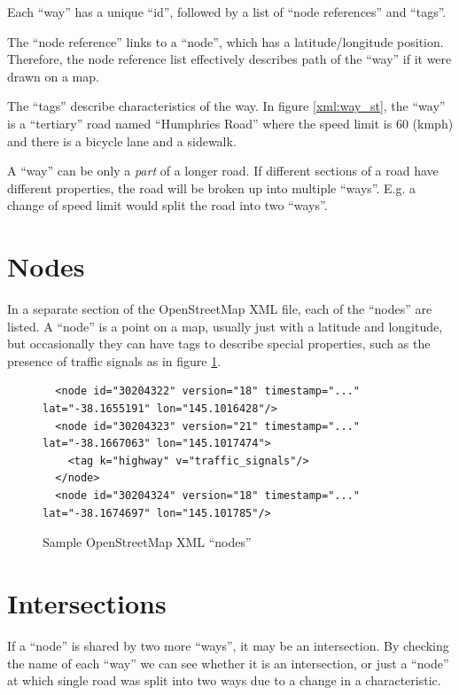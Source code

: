 \documentclass[11pt,twoside]{report}
\begin{document}
Each ``way'' has a unique ``id'', followed by a list of ``node references'' and ``tags''.

The ``node reference'' links to a ``node'', which has a latitude/longitude position.  Therefore, the node reference list effectively describes path of the ``way'' if it were drawn on a map.

The ``tags'' describe characteristics of the way.  In figure \ref{xml:way_st}, the ``way'' is a ``tertiary'' road named ``Humphries Road'' where the speed limit is 60 (kmph) and there is a bicycle lane and a sidewalk.

A ``way'' can be only a \textit{part} of a longer road.  If different sections of a road have different properties, the road will be broken up into multiple ``ways''.  E.g. a change of speed limit would split the road into two ``ways''.

\clearpage
\section{Nodes}
\label{osm:nodes}

In a separate section of the OpenStreetMap XML file, each of the ``nodes'' are listed.  A ``node'' is a point on a map, usually just with a latitude and longitude, but occasionally they can have tags to describe special properties, such as the presence of traffic signals as in figure \ref{xml:way_nodes}.\\

\begin{figure}[h]
\centering
\begin{verbatim}
  <node id="30204322" version="18" timestamp="..." lat="-38.1655191" lon="145.1016428"/>
  <node id="30204323" version="21" timestamp="..." lat="-38.1667063" lon="145.1017474">
    <tag k="highway" v="traffic_signals"/>
  </node>
  <node id="30204324" version="18" timestamp="..." lat="-38.1674697" lon="145.101785"/>	
\end{verbatim}
\caption{Sample OpenStreetMap XML ``nodes''}
\label{xml:way_nodes}
\end{figure}

\section{Intersections}
\label{osm:intersections}

If a ``node'' is shared by two more ``ways'', it may be an intersection.  By checking the name of each ``way'' we can see whether it is an intersection, or just a ``node'' at which single road was split into two ways due to a change in a characteristic.
\end{document}

